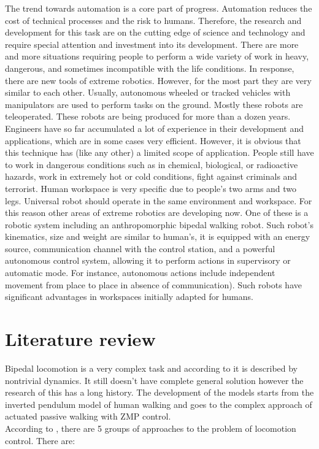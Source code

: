 \documentclass[11pt,a4paper]{report}
\begin{document}
		The trend towards automation is a core part of progress. Automation reduces the cost of technical processes and the risk to humans. Therefore, the research and development for this task are on the cutting edge of science and technology and require special attention and investment into its development. There are more and more situations requiring people to perform a wide variety of work in heavy, dangerous, and sometimes incompatible with the life conditions. In response, there are new tools of extreme robotics. However, for the most part they are very similar to each other. Usually, autonomous wheeled or tracked vehicles with manipulators are used to perform tasks on the ground. Mostly these robots are teleoperated. These robots are being produced for more than a dozen years. Engineers have so far accumulated a lot of experience in their development and applications, which are in some cases very efficient. However, it is obvious that this technique has (like any other) a limited scope of application. People still have to work in dangerous conditions such as in chemical, biological, or radioactive hazards, work in extremely hot or cold conditions, fight against criminals and terrorist.
		Human workspace is very specific due to people's two arms and two legs. Universal robot should operate in the same environment and workspace. For this reason other areas of extreme robotics are developing now.
		One of these is a robotic system including an anthropomorphic bipedal walking robot. Such robot's kinematics, size and weight are similar to human's, it is equipped with an energy source, communication channel with the control station, and a powerful autonomous control system, allowing it to perform actions in supervisory or automatic mode. For instance, autonomous actions include independent movement from place to place in absence of communication). Such robots have significant advantages in workspaces initially adapted for humans.

	\chapter{Literature review}
		Bipedal locomotion is a very complex task and according to \cite{erbatur2002study} it is described by nontrivial dynamics. It still doesn't have complete general solution however the research of this has a long history. The development of the models starts from the inverted pendulum model of human walking and goes to the complex approach of actuated passive walking with ZMP control.\\
		According to \cite{wright2014intelligent}, there are 5 groups of approaches to the problem of locomotion control. There are:
		
\end{document}
